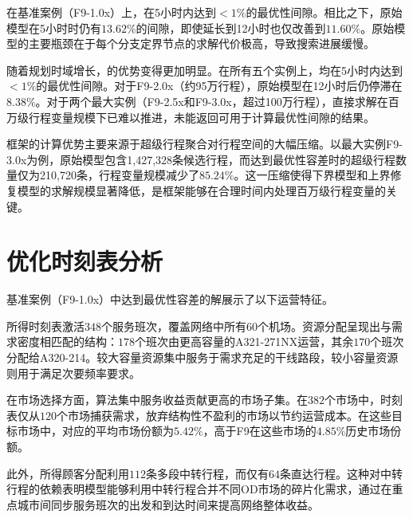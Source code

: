 在基准案例（F9-1.0x）上，\algoNotation 在5小时内达到$<1\%$的最优性间隙。相比之下，原始模型在5小时时仍有$13.62\%$的间隙，即使延长到12小时也仅改善到$11.60\%$。原始模型的主要瓶颈在于每个分支定界节点的求解代价极高，导致搜索进展缓慢。

随着规划时域增长，\algoNotation 的优势变得更加明显。在所有五个实例上，\algoNotation 均在5小时内达到$<1\%$的最优性间隙。对于F9-2.0x（约95万行程），原始模型在12小时后仍停滞在$8.38\%$。对于两个最大实例（F9-2.5x和F9-3.0x，超过100万行程），直接求解在百万级行程变量规模下已难以推进，未能返回可用于计算最优性间隙的结果。

\algoNotation 框架的计算优势主要来源于超级行程聚合对行程空间的大幅压缩。以最大实例F9-3.0x为例，原始模型包含1{,}427{,}328条候选行程，而\algoNotation 达到最优性容差时的超级行程数量仅为210{,}720条，行程变量规模减少了$85.24\%$。这一压缩使得下界模型和上界修复模型的求解规模显著降低，是框架能够在合理时间内处理百万级行程变量的关键。

\section{优化时刻表分析}
基准案例（F9-1.0x）中达到最优性容差的解展示了以下运营特征。

所得时刻表激活$348$个服务班次，覆盖网络中所有$60$个机场。资源分配呈现出与需求密度相匹配的结构：$178$个班次由更高容量的A321-271NX运营，其余$170$个班次分配给A320-214。较大容量资源集中服务于需求充足的干线路段，较小容量资源则用于满足次要频率要求。

在市场选择方面，算法集中服务收益贡献更高的市场子集。在$382$个市场中，时刻表仅从$120$个市场捕获需求，放弃结构性不盈利的市场以节约运营成本。在这些目标市场中，对应的平均市场份额为$5.42\%$，高于F9在这些市场的$4.85\%$历史市场份额。

此外，所得顾客分配利用$112$条多段中转行程，而仅有$64$条直达行程。这种对中转行程的依赖表明模型能够利用中转行程合并不同OD市场的碎片化需求，通过在重点城市间同步服务班次的出发和到达时间来提高网络整体收益。
